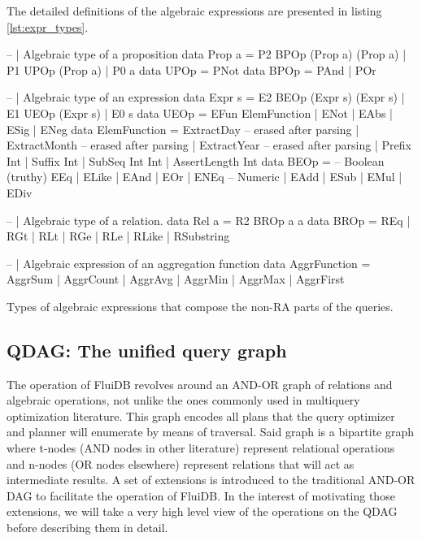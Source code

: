 The detailed definitions of the algebraic expressions are presented in
listing \ref{lst:expr_types}.

\begin{code}
  \begin{haskellcode}
    -- | Algebraic type of a proposition
    data Prop a = P2 BPOp (Prop a) (Prop a)
      | P1 UPOp (Prop a)
      | P0 a
    data UPOp = PNot
    data BPOp = PAnd | POr

    -- | Algebraic type of an expression
    data Expr s = E2 BEOp (Expr s) (Expr s)
      | E1 UEOp (Expr s)
      | E0 s
    data UEOp =
      EFun ElemFunction
      | ENot
      | EAbs
      | ESig
      | ENeg
    data ElemFunction
      = ExtractDay -- erased after parsing
      | ExtractMonth -- erased after parsing
      | ExtractYear -- erased after parsing
      | Prefix Int
      | Suffix Int
      | SubSeq Int Int
      | AssertLength Int
    data BEOp =
      -- Boolean (truthy)
      EEq | ELike | EAnd | EOr | ENEq
      -- Numeric
      | EAdd | ESub | EMul | EDiv

    -- | Algebraic type of a relation.
    data Rel a = R2 BROp a a
    data BROp
      = REq
      | RGt
      | RLt
      | RGe
      | RLe
      | RLike
      | RSubstring

    -- | Algebraic expression of an aggregation function
    data AggrFunction = AggrSum
      | AggrCount
      | AggrAvg
      | AggrMin
      | AggrMax
      | AggrFirst
  \end{haskellcode}
  \label{lst:expr_types}
  \caption{Types of algebraic expressions that compose the non-RA parts of the queries.}
\end{code}

\subsection{QDAG: The unified query graph}
\label{sec:qdag}

The operation of FluiDB revolves around an AND-OR graph of relations
and algebraic operations, not unlike the ones commonly used in multiquery
optimization literature. This graph encodes all plans that the query
optimizer and planner will enumerate by means of traversal. Said graph is a bipartite
graph where t-nodes (AND nodes in other literature) represent
relational operations and n-nodes (OR nodes elsewhere) represent
relations that will act as intermediate results. 
A set of extensions is introduced to the traditional AND-OR DAG to
facilitate the operation of FluiDB. In the interest of motivating those 
extensions, we will take a very high level view of the operations on the QDAG 
before describing them in detail.

